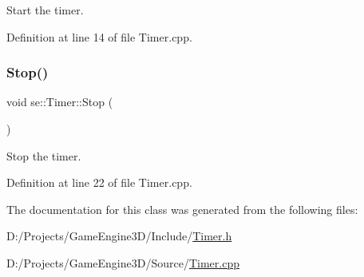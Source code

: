 Start the timer. 

Definition at line 14 of file Timer.\+cpp.

\mbox{\label{classse_1_1_timer_aed6b34f75ec989731c80fefe962493f3}} 
\subsubsection{\texorpdfstring{Stop()}{Stop()}}
{\footnotesize\ttfamily void se\+::\+Timer\+::\+Stop (\begin{DoxyParamCaption}{ }\end{DoxyParamCaption})}

Stop the timer. 

Definition at line 22 of file Timer.\+cpp.



The documentation for this class was generated from the following files\+:\begin{DoxyCompactItemize}
\item 
D\+:/\+Projects/\+Game\+Engine3\+D/\+Include/\mbox{\hyperlink{_timer_8h}{Timer.\+h}}\item 
D\+:/\+Projects/\+Game\+Engine3\+D/\+Source/\mbox{\hyperlink{_timer_8cpp}{Timer.\+cpp}}\end{DoxyCompactItemize}
